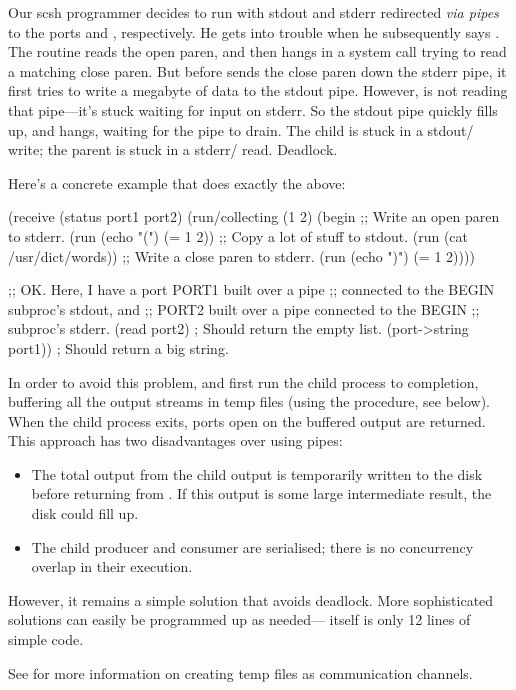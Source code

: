 \begin{desc}
Our scsh programmer decides to run  with stdout and stderr redirected
\emph{via {\Unix} pipes} to the ports  and , respectively. 
He gets into trouble when he subsequently says .
The {\Scheme}  routine reads the open paren, and then hangs in a
 system call trying to read a matching close paren.
But before  sends the close paren down the stderr
pipe, it first tries to write a megabyte of data to the stdout pipe. 
However, {\Scheme} is not reading that pipe---it's stuck waiting for input on
stderr.
So the stdout pipe quickly fills up, and  hangs, waiting for the
pipe to drain.
The  child is stuck in a stdout/ write;
the {\Scheme} parent is stuck in a stderr/ read. 
Deadlock.

Here's a concrete example that does exactly the above:
\begin{code}
(receive (status port1 port2)
         (run/collecting (1 2) 
             (begin
               ;; Write an open paren to stderr.
               (run (echo "(") (= 1 2))
               ;; Copy a lot of stuff to stdout.
               (run (cat /usr/dict/words))
               ;; Write a close paren to stderr.
               (run (echo ")") (= 1 2))))

   ;; OK. Here, I have a port PORT1 built over a pipe
   ;; connected to the BEGIN subproc's stdout, and
   ;; PORT2 built over a pipe connected to the BEGIN
   ;; subproc's stderr.
   (read port2) ; Should return the empty list.
   (port->string port1)) ; Should return a big string.\end{code}
%
In order to avoid this problem,  and 
first run the child process to completion, buffering all the output
streams in temp files (using the  procedure, see below).
When the child process exits, ports open on the buffered output are returned.
This approach has two disadvantages over using pipes:
\begin{itemize}
    \item The total output from the child output is temporarily written
      to the disk before returning from . If this output
      is some large intermediate result, the disk could fill up.

    \item The child producer and {\Scheme} consumer are serialised; there is
      no concurrency overlap in their execution.
\end{itemize}
%
However, it remains a simple solution that avoids deadlock.  More
sophisticated solutions can easily be programmed up as 
needed--- itself is only 12 lines of simple code.
    
See  for more information on creating temp files
as communication channels.
\end{desc}


